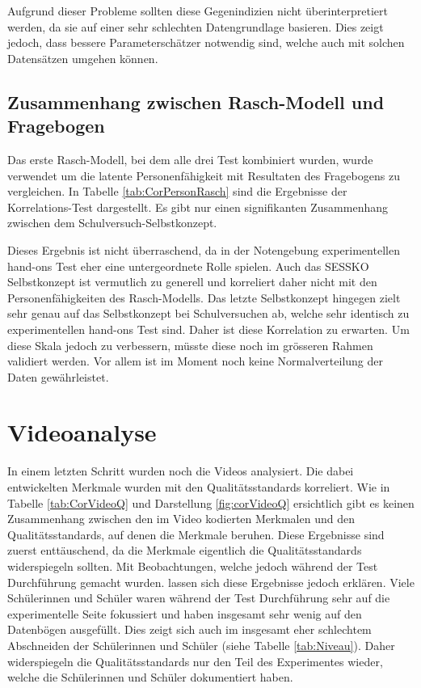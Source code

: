 Aufgrund dieser Probleme sollten diese Gegenindizien nicht überinterpretiert werden, da sie auf einer sehr schlechten Datengrundlage basieren. Dies zeigt jedoch, dass bessere Parameterschätzer notwendig sind, welche auch mit solchen Datensätzen umgehen können.

\subsection{Zusammenhang zwischen Rasch-Modell und Fragebogen}

Das erste Rasch-Modell, bei dem alle drei Test kombiniert wurden, wurde verwendet um die latente Personenfähigkeit mit Resultaten des Fragebogens zu vergleichen. In Tabelle \ref{tab:CorPersonRasch} sind die Ergebnisse der Korrelations-Test dargestellt. Es gibt nur einen signifikanten Zusammenhang zwischen dem Schulversuch-Selbstkonzept. 

Dieses Ergebnis ist nicht überraschend, da in der Notengebung experimentellen hand-ons Test eher eine untergeordnete Rolle spielen. Auch das SESSKO Selbstkonzept \citep{Schone2002} ist vermutlich zu generell und korreliert daher nicht mit den Personenfähigkeiten des Rasch-Modells. Das letzte Selbstkonzept hingegen zielt sehr genau auf das Selbstkonzept bei Schulversuchen ab, welche sehr identisch zu experimentellen hand-ons Test sind. Daher ist diese Korrelation zu erwarten. Um diese Skala jedoch zu verbessern, müsste diese noch im grösseren Rahmen validiert werden. Vor allem ist im Moment noch keine Normalverteilung der Daten gewährleistet.

\section{Videoanalyse}

In einem letzten Schritt wurden noch die Videos analysiert. Die dabei entwickelten Merkmale wurden mit den Qualitätsstandards korreliert. Wie in Tabelle \ref{tab:CorVideoQ} und Darstellung \ref{fig:corVideoQ} ersichtlich gibt es keinen Zusammenhang zwischen den im Video kodierten Merkmalen und den Qualitätsstandards, auf denen die Merkmale beruhen. Diese Ergebnisse sind zuerst enttäuschend, da die Merkmale eigentlich die Qualitätsstandards widerspiegeln sollten. Mit Beobachtungen, welche jedoch während der Test Durchführung gemacht wurden. lassen sich diese Ergebnisse jedoch erklären. Viele Schülerinnen und Schüler waren während der Test Durchführung sehr auf die experimentelle Seite fokussiert und haben insgesamt sehr wenig auf den Datenbögen ausgefüllt. Dies zeigt sich auch im insgesamt eher schlechtem Abschneiden der Schülerinnen und Schüler (siehe Tabelle \ref{tab:Niveau}). Daher widerspiegeln die Qualitätsstandards nur den Teil des Experimentes wieder, welche die Schülerinnen und Schüler dokumentiert haben. 

